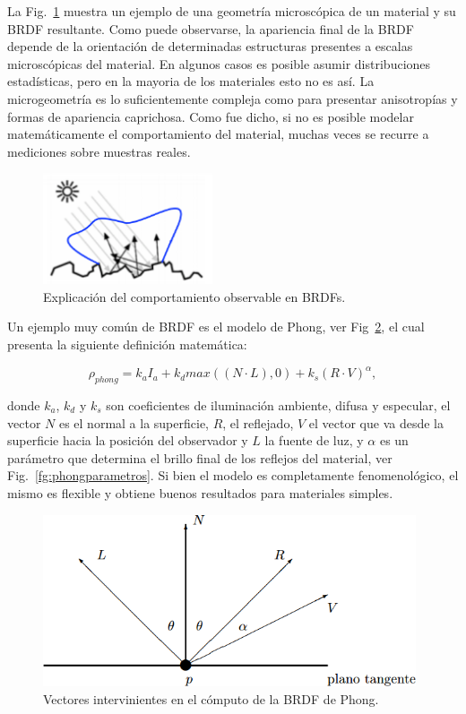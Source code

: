 La Fig.~\ref{fg:microestructura} muestra un ejemplo de una geometría microscópica de un material y su BRDF resultante.
Como puede observarse, la apariencia final de la BRDF depende de la orientación de determinadas estructuras presentes a escalas microscópicas del material.
En algunos casos es posible asumir distribuciones estadísticas, pero en la mayoria de los materiales esto no es así.
La microgeometría es lo suficientemente compleja como para presentar anisotropías y formas de apariencia caprichosa.
Como fue dicho, si no es posible modelar matemáticamente el comportamiento del material, muchas veces se recurre a mediciones sobre muestras reales.


\begin{figure}
\center
\includegraphics[width=5cm]{figures/microestructura}
\caption{Explicación del comportamiento observable en BRDFs.}
\label{fg:microestructura}
\end{figure}

Un ejemplo muy común de BRDF es el modelo de Phong, ver Fig~\ref{fg:phongVecs}, el cual presenta la siguiente definición matemática:

$$\rho_{phong} =  k_{a} I_{a} + k_{d} max((N \cdot L),0) + k_{s} (R \cdot V)^{\alpha},$$

donde $k_{a}$, $k_{d}$ y $k_{s}$ son coeficientes de iluminación ambiente, difusa y especular, el vector $N$ es el normal a la superficie, $R$, el reflejado, $V$ el vector que va desde la superficie hacia la posición del observador y $L$ la fuente de luz, y $\alpha$ es un parámetro que determina el brillo final de los reflejos del material, ver Fig.~\ref{fg:phongparametros}.
Si bien el modelo es completamente fenomenológico, el mismo es flexible y obtiene buenos resultados para materiales simples.


\begin{figure}
\center
\includegraphics[width=11cm]{figures/phongVecs}
\caption{Vectores intervinientes en el cómputo de la BRDF de Phong.}
\label{fg:phongVecs}
\end{figure}

